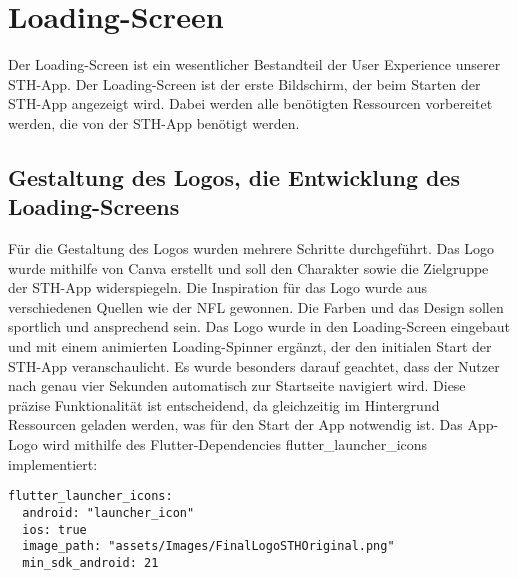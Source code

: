\chapter{Loading-Screen}
Der Loading-Screen ist ein wesentlicher Bestandteil der User Experience unserer STH-App. Der Loading-Screen ist der erste Bildschirm, der beim Starten der STH-App angezeigt wird. Dabei werden alle benötigten Ressourcen vorbereitet werden, die von der STH-App benötigt werden.

\section{Gestaltung des Logos, die Entwicklung des Loading-Screens}
Für die Gestaltung des Logos wurden mehrere Schritte durchgeführt. Das Logo wurde mithilfe von Canva erstellt und soll den Charakter sowie die Zielgruppe der STH-App widerspiegeln.
Die Inspiration für das Logo wurde aus verschiedenen Quellen wie der NFL gewonnen. Die Farben und das Design sollen sportlich und ansprechend sein.
Das Logo wurde in den Loading-Screen eingebaut und mit einem animierten Loading-Spinner ergänzt, der den initialen Start der STH-App veranschaulicht. 
Es wurde besonders darauf geachtet, dass der Nutzer nach genau vier Sekunden automatisch zur Startseite navigiert wird. Diese präzise Funktionalität ist entscheidend, da gleichzeitig im Hintergrund Ressourcen geladen werden, was für den Start der App notwendig ist.
Das App-Logo wird mithilfe des Flutter-Dependencies flutter\_launcher\_icons implementiert:
\begin{verbatim}
flutter_launcher_icons:
  android: "launcher_icon"
  ios: true
  image_path: "assets/Images/FinalLogoSTHOriginal.png"
  min_sdk_android: 21
\end{verbatim}

